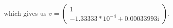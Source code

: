 \documentclass[preview]{standalone}
\begin{document}
\begin{center}
\raggedright
                which gives us \(v = \begin{pmatrix}
                                1 \\
                                -1.33333 * 10^{-4} + 0.00033993\mathrm{i}
                            \end{pmatrix}\).
\end{center}
\end{document}
